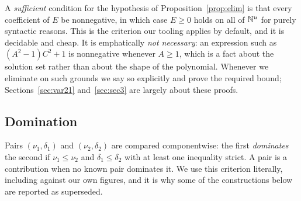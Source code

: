 \begin{remark}
\label{rem:crit}
A \emph{sufficient} condition for the hypothesis of
Proposition~\ref{prop:elim} is that every coefficient of $E$ be nonnegative, in
which case $E\ge 0$ holds on all of $\mathbb{N}^{u}$ for purely syntactic reasons. This
is the criterion our tooling applies by default, and it is decidable and cheap.
It is emphatically \emph{not necessary}: an expression such as $(A^2-1)C^2+1$
is nonnegative whenever $A\ge1$, which is a fact about the solution set rather
than about the shape of the polynomial. Whenever we eliminate on such grounds we
say so explicitly and prove the required bound; Sections~\ref{sec:var21}
and~\ref{sec:sec3} are largely about these proofs.
\end{remark}

\subsection{Domination}

Pairs $(\nu_1,\delta_1)$ and $(\nu_2,\delta_2)$ are compared componentwise: the
first \emph{dominates} the second if $\nu_1\le\nu_2$ and $\delta_1\le\delta_2$
with at least one inequality strict. A pair is a contribution when no known pair
dominates it. We use this criterion literally, including against our own
figures, and it is why some of the constructions below are reported as
superseded.
